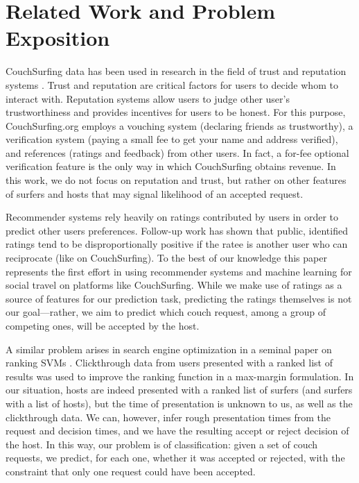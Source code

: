 \section{Related Work and Problem Exposition}

CouchSurfing data has been used in research in the field of trust and reputation systems \cite{lauterbach2009surfing}. Trust and reputation are critical factors for users to decide whom to interact with. Reputation systems allow users to judge other user's trustworthiness and provides incentives for users to be honest. For this purpose, CouchSurfing.org employs a vouching system (declaring friends as trustworthy), a verification system (paying a small fee to get your name and address verified), and references (ratings and feedback) from other users.
In fact, a for-fee optional verification feature is the only way in which CouchSurfing obtains revenue.
In this work, we do not focus on reputation and trust, but rather on other features of surfers and hosts that may signal likelihood of an accepted request.

Recommender systems rely heavily on ratings contributed by users in order to predict other users preferences. Follow-up work has shown that public, identified ratings tend to be disproportionally positive if the ratee is another user who can reciprocate \cite{teng2010rate} (like on CouchSurfing). 
To the best of our knowledge this paper represents the first effort in using recommender systems and machine learning for social travel on platforms like CouchSurfing.
While we make use of ratings as a source of features for our prediction task, predicting the ratings themselves is not our goal---rather, we aim to predict which couch request, among a group of competing ones, will be accepted by the host.

A similar problem arises in search engine optimization in a seminal paper on ranking SVMs \cite{Joachims2002}.
Clickthrough data from users presented with a ranked list of results was used to improve the ranking function in a max-margin formulation.
In our situation, hosts are indeed presented with a ranked list of surfers (and surfers with a list of hosts), but the time of presentation is unknown to us, as well as the clickthrough data.
We can, however, infer rough presentation times from the request and decision times, and we have the resulting accept or reject decision of the host.
In this way, our problem is of classification: given a set of couch requests, we predict, for each one, whether it was accepted or rejected, with the constraint that only one request could have been accepted.

